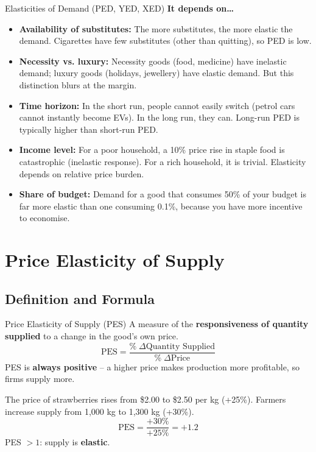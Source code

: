 \documentclass[11pt, a4paper, twoside]{book}
\begin{document}
\begin{evaluation}{Elasticities of Demand (PED, YED, XED)}
\textbf{It depends on\ldots}
\begin{itemize}[leftmargin=*, nosep]
\item \textbf{Availability of substitutes:} The more substitutes, the more elastic the demand. Cigarettes have few substitutes (other than quitting), so PED is low.
\item \textbf{Necessity vs. luxury:} Necessity goods (food, medicine) have inelastic demand; luxury goods (holidays, jewellery) have elastic demand. But this distinction blurs at the margin.
\item \textbf{Time horizon:} In the short run, people cannot easily switch (petrol cars cannot instantly become EVs). In the long run, they can. Long-run PED is typically higher than short-run PED.
\item \textbf{Income level:} For a poor household, a 10\% price rise in staple food is catastrophic (inelastic response). For a rich household, it is trivial. Elasticity depends on relative price burden.
\item \textbf{Share of budget:} Demand for a good that consumes 50\% of your budget is far more elastic than one consuming 0.1\%, because you have more incentive to economise.
\end{itemize}
\end{evaluation}

\section{Price Elasticity of Supply}



\subsection{Definition and Formula}

\begin{keyterm}{Price Elasticity of Supply (PES)}
A measure of the \textbf{responsiveness of quantity supplied} to a change in the good's own price.
\[
\text{PES} = \frac{\%\;\Delta\text{Quantity Supplied}}{\%\;\Delta\text{Price}}
\]
PES is \textbf{always positive} -- a higher price makes production more profitable, so firms supply more.
\end{keyterm}

\begin{example}
The price of strawberries rises from \$2.00 to \$2.50 per kg (+25\%). Farmers increase supply from 1{,}000 kg to 1{,}300 kg (+30\%).
\[
\text{PES} = \frac{+30\%}{+25\%} = +1.2
\]
PES $> 1$: supply is \textbf{elastic}.
\end{example}
\end{document}
